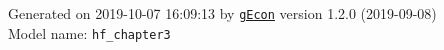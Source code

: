 \documentclass[10pt,a4paper]{article}
\numberwithin{equation}{section}
\begin{document}
\begin{flushleft}{\large
Generated  on 2019-10-07 16:09:13 by \href{http://gecon.r-forge.r-project.org/}{\texttt{gEcon}} version 1.2.0 (2019-09-08)\\
Model name: \verb+hf_chapter3+
}\end{flushleft}



\end{document}
